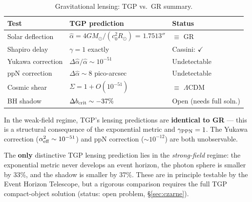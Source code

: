 \begin{table}[h]
\centering\small
\caption{Gravitational lensing: TGP vs.\ GR summary.}
\label{tab:lensing-summary}
\begin{tabular}{@{}lp{4.5cm}p{3.5cm}@{}}
\toprule
\textbf{Test} & \textbf{TGP prediction} & \textbf{Status} \\
\midrule
Solar deflection   & $\hat\alpha = 4GM_\odot/(c_0^2 R_\odot)$
  = $1.7513''$ & $\equiv$ GR \\[3pt]
Shapiro delay      & $\gamma = 1$ exactly
  & Cassini: $\checkmark$ \\[3pt]
Yukawa correction  & $\Delta\hat\alpha/\hat\alpha \sim 10^{-51}$
  & Undetectable \\[3pt]
ppN correction     & $\Delta\hat\alpha \sim 8$ pico-arcsec
  & Undetectable \\[3pt]
Cosmic shear       & $\Sigma = 1 + O(10^{-51})$
  & $\equiv$ $\Lambda$CDM \\[3pt]
BH shadow          & $\Delta b_{\rm crit} \sim -37\%$
  & Open (needs full soln.) \\
\bottomrule
\end{tabular}
\end{table}

\begin{remark}\label{rem:lensing-conclusion}
In the weak-field regime, TGP's lensing predictions are
\textbf{identical to GR} --- this is a structural consequence
of the exponential metric and $\gamma_{\rm PPN} = 1$.
The Yukawa correction ($\alpha_{\rm eff}^2 \sim 10^{-51}$)
and ppN correction ($\sim 10^{-12}$) are both unobservable.

The \textbf{only} distinctive TGP lensing prediction lies
in the \emph{strong-field} regime: the exponential metric
never develops an event horizon, the photon sphere is smaller
by 33\%, and the shadow is smaller by 37\%.
These are in principle testable by the Event Horizon Telescope,
but a rigorous comparison requires the full TGP compact-object
solution (status: open problem, \S\ref{sec:czarne}).
\end{remark}
